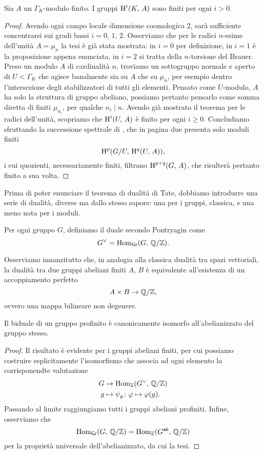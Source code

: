 \begin{corollary} \label{finiti}
	Sia $ A $ un $ \Gamma_K $-modulo finito. I gruppi $ \operatorname{H}^i(K, \, A) $ sono finiti per ogni $ i > 0 $.
\end{corollary}
\begin{proof}
	Avendo ogni campo locale dimensione coomologica $ 2 $, sarà sufficiente concentrarsi sui gradi bassi $ i = 0, \, 1, \, 2 $. Osserviamo che per le radici $ n $-esime dell'unità $ A = \mu_n $ la tesi è già stata mostrata: in $ i = 0 $ per definizione, in $ i = 1 $ è la proposizione appena enunciata, in $ i = 2 $ si tratta della $ n $-torsione del Brauer. Preso un modulo $ A $ di cardinalità $ n $, troviamo un sottogruppo normale e aperto di $ U < \Gamma_K $ che agisce banalmente sia su $ A $ che su $ \mu_n $, per esempio dentro l'intersezione degli stabilizzatori di tutti gli elementi. Pensato come $ U $-modulo, $ A $ ha solo la struttura di gruppo abeliano, possiamo pertanto pensarlo come somma diretta di finiti $ \mu_{n_i} $, per qualche $ n_i \mid n $. Avendo già mostrato il teorema per le radici dell'unità, scopriamo che $ \operatorname{H}^i(U, \, A) $ è finito per ogni $ i \geq 0 $. Concludiamo sfruttando la successione spettrale di \HS, che in pagina due presenta solo moduli finiti
	\[ \operatorname{H}^p(G/U, \, \operatorname{H}^q(U, \, A)), \]
	i cui quozienti, necessariamente finiti, filtrano $ \operatorname{H}^{p+q}(G, \, A) $, che risulterà pertanto finito a sua volta.
\end{proof}

Prima di poter enunciare il teorema di dualità di Tate, dobbiamo introdurre una serie di dualità, diverse ma dallo stesso sapore: una per i gruppi, classica, e una meno nota per i moduli.

\begin{definition}
	Per ogni gruppo $ G $, definiamo il duale secondo Pontryagin come
	\[ G^\vee = \operatorname{Hom}_\mathsf{Gr}(G, \, \mathbb{Q}/\mathbb{Z}). \]
\end{definition}

Osserviamo innanzitutto che, in analogia alla classica dualità tra spazi vettoriali, la dualità tra due gruppi abeliani finiti $ A, \, B $ è equivalente all'esistenza di un accoppiamento perfetto
\[ A \times B \to \mathbb{Q}/\mathbb{Z}, \]
ovvero una mappa bilineare non degenere.

\begin{proposition}
	Il biduale di un gruppo profinito è canonicamente isomorfo all'abelianizzato del gruppo stesso. 
\end{proposition}
\begin{proof}
	Il risultato è evidente per i gruppi abeliani finiti, per cui possiamo costruire esplicitamente l'isomorfismo che associa ad ogni elemento la corrisponendte valutazione
	\begin{align*}
		G & \to \operatorname{Hom}_{\mathbb{Z}}(G^\vee, \, \mathbb{Q}/\mathbb{Z}) \\
		g & \mapsto \psi_g \colon \varphi \mapsto \varphi(g).
	\end{align*}
	Passando al limite raggiungiamo tutti i gruppi abeliani profiniti. Infine, osserviamo che
	\[ \operatorname{Hom}_\mathsf{Gr}(G, \, \mathbb{Q}/\mathbb{Z})  = \operatorname{Hom}_{\mathbb{Z}}(G^\texttt{ab}, \, \mathbb{Q}/\mathbb{Z}) \]
	per la proprietà universale dell'abelianizzato, da cui la tesi.
\end{proof}

